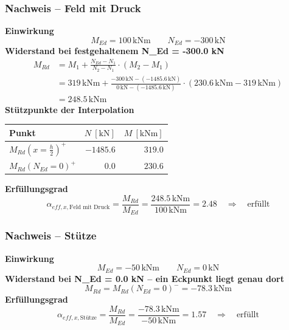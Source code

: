 \documentclass[11pt,a4paper]{article}
\begin{document}
\subsubsection{Nachweis – Feld mit Druck}
\noindent\textbf{Einwirkung}
\begin{equation*}
M_{Ed} = 100\,\mathrm{kNm} \qquad N_{Ed} = -300\,\mathrm{kN}
\end{equation*}
\noindent\textbf{Widerstand bei festgehaltenem N\_Ed = -300.0 kN}
\begin{equation*}
\begin{aligned}
  M_{Rd} &= M_1 + \frac{N_{Ed} - N_1}{N_2 - N_1} \cdot \left(M_2 - M_1\right) \\
  &= 319\,\mathrm{kNm} + \frac{-300\,\mathrm{kN} - \left(-1485.6\,\mathrm{kN}\right)}{0\,\mathrm{kN} - \left(-1485.6\,\mathrm{kN}\right)} \cdot \left(230.6\,\mathrm{kNm} - 319\,\mathrm{kNm}\right) \\
  &= 248.5\,\mathrm{kNm}
\end{aligned}
\end{equation*}
\noindent\textbf{Stützpunkte der Interpolation}
\begin{longtable}{lrr}
\hline
Punkt & $N\ [\mathrm{kN}]$ & $M\ [\mathrm{kNm}]$ \\
\hline
\endhead
$M_{Rd}(x=\tfrac{h}{2})^{+}$ & $-1485.6$ & $319.0$ \\
$M_{Rd}(N_{Ed}=0)^{+}$ & $0.0$ & $230.6$ \\
\hline
\end{longtable}
\noindent\textbf{Erfüllungsgrad}
\begin{equation*}
\alpha_{eff,x,\text{Feld mit Druck}} = \frac{M_{Rd}}{M_{Ed}} = \frac{248.5\,\mathrm{kNm}}{100\,\mathrm{kNm}} = 2.48 \quad \Rightarrow \quad \text{erfüllt}
\end{equation*}
\subsubsection{Nachweis – Stütze}
\noindent\textbf{Einwirkung}
\begin{equation*}
M_{Ed} = -50\,\mathrm{kNm} \qquad N_{Ed} = 0\,\mathrm{kN}
\end{equation*}
\noindent\textbf{Widerstand bei N\_Ed = 0.0 kN – ein Eckpunkt liegt genau dort}
\begin{equation*}
M_{Rd} = M_{Rd}(N_{Ed}=0)^{-} = -78.3\,\mathrm{kNm}
\end{equation*}
\noindent\textbf{Erfüllungsgrad}
\begin{equation*}
\alpha_{eff,x,\text{Stütze}} = \frac{M_{Rd}}{M_{Ed}} = \frac{-78.3\,\mathrm{kNm}}{-50\,\mathrm{kNm}} = 1.57 \quad \Rightarrow \quad \text{erfüllt}
\end{equation*}
\end{document}
